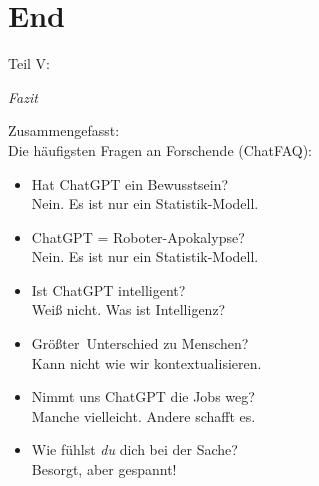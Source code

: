 \documentclass[aspectratio=169,usenames,dvipsnames]{beamer}
\begin{document}

\section{End}

\begin{frame}
\begin{center}
\Large
Teil V:
\bigskip

\Huge
\emph{Fazit}
\end{center}
\end{frame}

\begin{frame}
\begin{center}
Zusammengefasst:\\
Die häufigsten Fragen an Forschende (ChatFAQ):\pause
\end{center}
\bigskip

\begin{minipage}{0.5\textwidth}
\begin{itemize}
\item Hat ChatGPT ein Bewusstsein?\\ Nein. Es ist nur ein Statistik-Modell.\pause\medskip

\item ChatGPT = Roboter-Apokalypse?\\ Nein. Es ist nur ein Statistik-Modell.\pause\medskip

\item Ist ChatGPT intelligent?\\ Weiß nicht. Was ist \glqq Intelligenz\grqq ?\pause
\end{itemize}
\end{minipage}%
\begin{minipage}{0.5\textwidth}
\begin{itemize}
\item \glqq Größter\grqq\ Unterschied zu Menschen?\\ Kann nicht wie wir kontextualisieren.\pause\medskip

\item Nimmt uns ChatGPT die Jobs weg?\\ Manche vielleicht. Andere schafft es.\pause\medskip

\item Wie fühlst \emph{du} dich bei der Sache?\\ Besorgt, aber gespannt!
\end{itemize}
\end{minipage}
\end{frame}
\end{document}
